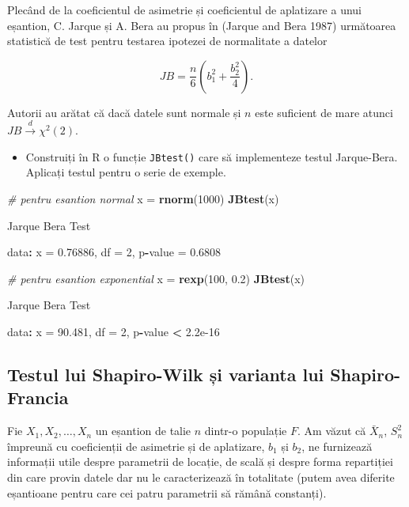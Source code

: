 \documentclass[]{article}
\newenvironment{Shaded}{\begin{snugshade}}{\end{snugshade}}
\newcommand{\KeywordTok}[1]{\textcolor[rgb]{0.13,0.29,0.53}{\textbf{#1}}}
\newcommand{\DecValTok}[1]{\textcolor[rgb]{0.00,0.00,0.81}{#1}}
\newcommand{\FloatTok}[1]{\textcolor[rgb]{0.00,0.00,0.81}{#1}}
\newcommand{\StringTok}[1]{\textcolor[rgb]{0.31,0.60,0.02}{#1}}
\newcommand{\CommentTok}[1]{\textcolor[rgb]{0.56,0.35,0.01}{\textit{#1}}}
\newcommand{\OperatorTok}[1]{\textcolor[rgb]{0.81,0.36,0.00}{\textbf{#1}}}
\newcommand{\NormalTok}[1]{#1}
\newenvironment{frshaded*}{%
  \def\FrameCommand{\fboxrule=\FrameRule\fboxsep=\FrameSep \fcolorbox{framecolor}{shadecolor1}}%
  \MakeFramed {\advance\hsize-\width \FrameRestore}}%
{\endMakeFramed}
\newenvironment{rmdblock}[1]
  {\begin{frshaded*}
  \begin{itemize}
  \renewcommand{\labelitemi}{
    \raisebox{-.7\height}[0pt][0pt]{
      {\setkeys{Gin}{width=2em,keepaspectratio}\texttt{[image: images/icons/\#1]}}
    }
  }
  \item
  }
  {
  \end{itemize}
  \end{frshaded*}
  }
\newenvironment{rmdexercise}
  {\begin{rmdblock}{exercise}}
  {\end{rmdblock}}
\begin{document}
Plecând de la coeficientul de asimetrie și coeficientul de aplatizare a
unui eșantion, C. Jarque și A. Bera au propus în (Jarque and Bera 1987)
următoarea statistică de test pentru testarea ipotezei de normalitate a
datelor

\[
  JB = \frac{n}{6}\left(b_1^2 + \frac{b_2^2}{4}\right).
\]

Autorii au arătat că dacă datele sunt normale și \(n\) este suficient de
mare atunci \(JB\overset{d}{\to}\chi^2(2)\).

\begin{rmdexercise}
Construiți în R o funcție \texttt{JBtest()} care să implementeze testul
Jarque-Bera. Aplicați testul pentru o serie de exemple.
\end{rmdexercise}

\begin{Shaded}
\begin{Highlighting}[]
\CommentTok{# pentru esantion normal }
\NormalTok{x =}\StringTok{ }\KeywordTok{rnorm}\NormalTok{(}\DecValTok{1000}\NormalTok{)}
\KeywordTok{JBtest}\NormalTok{(x)}

\NormalTok{    Jarque Bera Test}

\NormalTok{data}\OperatorTok{:}\StringTok{  }\NormalTok{x}
\NormalTok{=}\StringTok{ }\FloatTok{0.76886}\NormalTok{, df =}\StringTok{ }\DecValTok{2}\NormalTok{, p}\OperatorTok{-}\NormalTok{value =}\StringTok{ }\FloatTok{0.6808}

\CommentTok{# pentru esantion exponential  }
\NormalTok{x =}\StringTok{ }\KeywordTok{rexp}\NormalTok{(}\DecValTok{100}\NormalTok{, }\FloatTok{0.2}\NormalTok{)}
\KeywordTok{JBtest}\NormalTok{(x)}

\NormalTok{    Jarque Bera Test}

\NormalTok{data}\OperatorTok{:}\StringTok{  }\NormalTok{x}
\NormalTok{=}\StringTok{ }\FloatTok{90.481}\NormalTok{, df =}\StringTok{ }\DecValTok{2}\NormalTok{, p}\OperatorTok{-}\NormalTok{value }\OperatorTok{<}\StringTok{ }\FloatTok{2.2e-16}
\end{Highlighting}
\end{Shaded}

\subsection{Testul lui Shapiro-Wilk și varianta lui
Shapiro-Francia}\label{testul-lui-shapiro-wilk-si-varianta-lui-shapiro-francia}

Fie \(X_1, X_2, \ldots, X_n\) un eșantion de talie \(n\) dintr-o
populație \(F\). Am văzut că \(\bar{X}_n\), \(S_n^2\) împreună cu
coeficienții de asimetrie și de aplatizare, \(b_1\) și \(b_2\), ne
furnizează informații utile despre parametrii de locație, de scală și
despre forma repartiției din care provin datele dar nu le caracterizează
în totalitate (putem avea diferite eșantioane pentru care cei patru
parametrii să rămână constanți).
\end{document}
